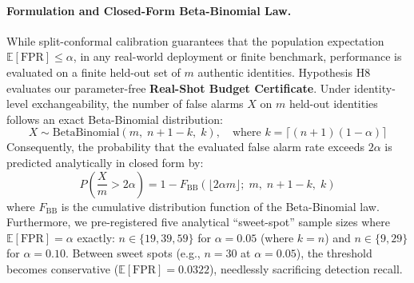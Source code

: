 \paragraph{Formulation and Closed-Form Beta-Binomial Law.}
While split-conformal calibration guarantees that the population expectation $\mathbb{E}[\text{FPR}] \le \alpha$, in any real-world deployment or finite benchmark, performance is evaluated on a finite held-out set of $m$ authentic identities. Hypothesis H8 evaluates our parameter-free \textbf{Real-Shot Budget Certificate}. Under identity-level exchangeability, the number of false alarms $X$ on $m$ held-out identities follows an exact Beta-Binomial distribution:
\begin{equation}
X \sim \text{BetaBinomial}(m, \; n + 1 - k, \; k), \quad \text{where } k = \lceil(n+1)(1-\alpha)\rceil
\end{equation}
Consequently, the probability that the evaluated false alarm rate exceeds $2\alpha$ is predicted analytically in closed form by:
\begin{equation}
P\left(\frac{X}{m} > 2\alpha\right) = 1 - F_{\text{BB}}(\lfloor 2\alpha m \rfloor; \; m, \; n + 1 - k, \; k)
\end{equation}
where $F_{\text{BB}}$ is the cumulative distribution function of the Beta-Binomial law. Furthermore, we pre-registered five analytical ``sweet-spot'' sample sizes where $\mathbb{E}[\text{FPR}] = \alpha$ exactly: $n \in \{19, 39, 59\}$ for $\alpha=0.05$ (where $k = n$) and $n \in \{9, 29\}$ for $\alpha=0.10$. Between sweet spots (e.g., $n=30$ at $\alpha=0.05$), the threshold becomes conservative ($\mathbb{E}[\text{FPR}] = 0.0322$), needlessly sacrificing detection recall.

